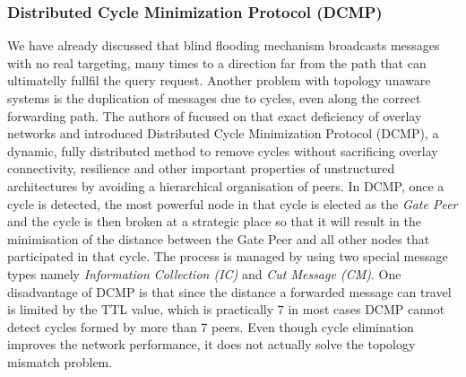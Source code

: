 \subsubsection{Distributed Cycle Minimization Protocol (DCMP)}
We have already discussed that blind flooding mechanism broadcasts messages with
no real targeting, many times to a direction far from the path that can
ultimatelly fullfil the query request. Another problem with topology unaware
systems is the duplication of messages due to cycles, even along the correct
forwarding path. The authors of \cite{ZKB2008} fucused on that exact deficiency
of overlay networks and introduced Distributed Cycle Minimization Protocol
(DCMP), a dynamic, fully distributed method to remove cycles without sacrificing
overlay connectivity, resilience and other important properties of unstructured
architectures by avoiding a hierarchical organisation of peers. In DCMP, once a
cycle is detected, the most powerful node in that cycle is elected as the
\emph{Gate Peer} and the cycle is then broken at a strategic place so that it
will result in the minimisation of the distance between the Gate Peer and all
other nodes that participated in that cycle. The process is managed by using two
special message types namely \emph{Information Collection (IC)} and \emph{Cut
Message (CM)}. One disadvantage of DCMP is that since the distance a forwarded
message can travel is limited by the TTL value, which is practically $7$ in most
cases DCMP cannot detect cycles formed by more than 7 peers. Even though cycle
elimination improves the network performance, it does not actually solve the
topology mismatch problem.

